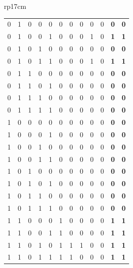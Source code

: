 \documentclass{article}
\begin{document}
\begin{longtable}[l]{rp{17cm}}
\begin{minipage}[t]{\linewidth}
\begin{tabular}{ccccc|ccccc|cc}
   0  &  1  &  0  &  0  &  0  &  0  &  0  &  0  &  0  &  0  & \textbf{ 0 } & \textbf{ 0 }\\
   0  &  1  &  0  &  0  &  1  &  0  &  0  &  0  &  1  &  0  & \textbf{ 1 } & \textbf{ 1 }\\
   0  &  1  &  0  &  1  &  0  &  0  &  0  &  0  &  0  &  0  & \textbf{ 0 } & \textbf{ 0 }\\
   0  &  1  &  0  &  1  &  1  &  0  &  0  &  0  &  1  &  0  & \textbf{ 1 } & \textbf{ 1 }\\
   0  &  1  &  1  &  0  &  0  &  0  &  0  &  0  &  0  &  0  & \textbf{ 0 } & \textbf{ 0 }\\
   0  &  1  &  1  &  0  &  1  &  0  &  0  &  0  &  0  &  0  & \textbf{ 0 } & \textbf{ 0 }\\
   0  &  1  &  1  &  1  &  0  &  0  &  0  &  0  &  0  &  0  & \textbf{ 0 } & \textbf{ 0 }\\
   0  &  1  &  1  &  1  &  1  &  0  &  0  &  0  &  0  &  0  & \textbf{ 0 } & \textbf{ 0 }\\
   1  &  0  &  0  &  0  &  0  &  0  &  0  &  0  &  0  &  0  & \textbf{ 0 } & \textbf{ 0 }\\
   1  &  0  &  0  &  0  &  1  &  0  &  0  &  0  &  0  &  0  & \textbf{ 0 } & \textbf{ 0 }\\
   1  &  0  &  0  &  1  &  0  &  0  &  0  &  0  &  0  &  0  & \textbf{ 0 } & \textbf{ 0 }\\
   1  &  0  &  0  &  1  &  1  &  0  &  0  &  0  &  0  &  0  & \textbf{ 0 } & \textbf{ 0 }\\
   1  &  0  &  1  &  0  &  0  &  0  &  0  &  0  &  0  &  0  & \textbf{ 0 } & \textbf{ 0 }\\
   1  &  0  &  1  &  0  &  1  &  0  &  0  &  0  &  0  &  0  & \textbf{ 0 } & \textbf{ 0 }\\
   1  &  0  &  1  &  1  &  0  &  0  &  0  &  0  &  0  &  0  & \textbf{ 0 } & \textbf{ 0 }\\
   1  &  0  &  1  &  1  &  1  &  0  &  0  &  0  &  0  &  0  & \textbf{ 0 } & \textbf{ 0 }\\
   1  &  1  &  0  &  0  &  0  &  1  &  0  &  0  &  0  &  0  & \textbf{ 1 } & \textbf{ 1 }\\
   1  &  1  &  0  &  0  &  1  &  1  &  0  &  0  &  0  &  0  & \textbf{ 1 } & \textbf{ 1 }\\
   1  &  1  &  0  &  1  &  0  &  1  &  1  &  1  &  0  &  0  & \textbf{ 1 } & \textbf{ 1 }\\
   1  &  1  &  0  &  1  &  1  &  1  &  1  &  0  &  0  &  0  & \textbf{ 1 } & \textbf{ 1 }\\

\end{tabular}
\end{minipage}
\end{longtable}
\end{document}

